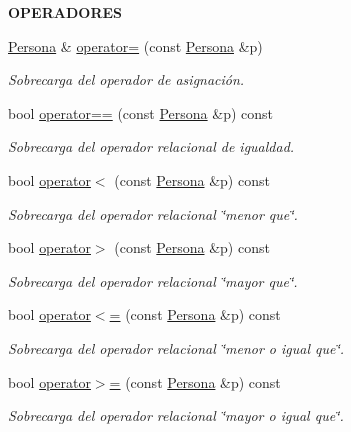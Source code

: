 \begin{Indent}{\bf O\+P\+E\+R\+A\+D\+O\+R\+E\+S}\par
\begin{DoxyCompactItemize}
\item 
\hyperlink{classedi_1_1Persona}{Persona} \& \hyperlink{classedi_1_1Persona_ae57360f67cc87d72b3529eab8fc10bea}{operator=} (const \hyperlink{classedi_1_1Persona}{Persona} \&p)
\begin{DoxyCompactList}\small\item\em Sobrecarga del operador de asignación. \end{DoxyCompactList}\item 
bool \hyperlink{classedi_1_1Persona_a72afb74752956b7fc478bbcf21a58419}{operator==} (const \hyperlink{classedi_1_1Persona}{Persona} \&p) const 
\begin{DoxyCompactList}\small\item\em Sobrecarga del operador relacional de igualdad. \end{DoxyCompactList}\item 
bool \hyperlink{classedi_1_1Persona_aa83845c0aa706592ca80355e66a4b489}{operator$<$} (const \hyperlink{classedi_1_1Persona}{Persona} \&p) const 
\begin{DoxyCompactList}\small\item\em Sobrecarga del operador relacional \char`\"{}menor que\char`\"{}. \end{DoxyCompactList}\item 
bool \hyperlink{classedi_1_1Persona_af183b841eb8e1b477e5e1391ea04c38e}{operator$>$} (const \hyperlink{classedi_1_1Persona}{Persona} \&p) const 
\begin{DoxyCompactList}\small\item\em Sobrecarga del operador relacional \char`\"{}mayor que\char`\"{}. \end{DoxyCompactList}\item 
bool \hyperlink{classedi_1_1Persona_a47db13059d784b7547a5a092b43f8971}{operator$<$=} (const \hyperlink{classedi_1_1Persona}{Persona} \&p) const 
\begin{DoxyCompactList}\small\item\em Sobrecarga del operador relacional \char`\"{}menor o igual que\char`\"{}. \end{DoxyCompactList}\item 
bool \hyperlink{classedi_1_1Persona_a7f3496fa4d87d6bd2c79ccbda98576d6}{operator$>$=} (const \hyperlink{classedi_1_1Persona}{Persona} \&p) const 
\begin{DoxyCompactList}\small\item\em Sobrecarga del operador relacional \char`\"{}mayor o igual que\char`\"{}. \end{DoxyCompactList}\end{DoxyCompactItemize}
\end{Indent}
